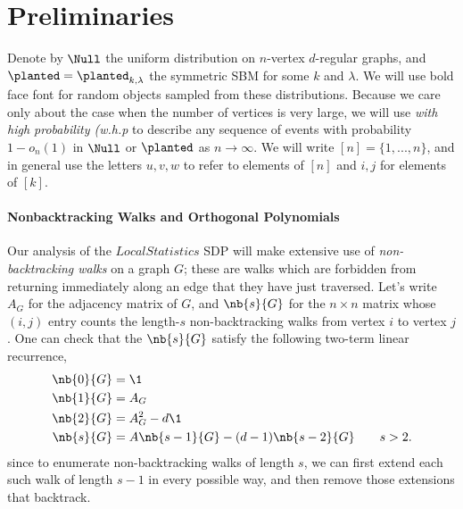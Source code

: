 \section{Preliminaries}
\label{sec:prelims}

Denote by $\Null$ the uniform distribution on $n$-vertex $d$-regular graphs, and $\planted = \planted_{k,\lambda}$ the symmetric SBM for some $k$ and $\lambda$. We will use bold face font for random objects sampled from these distributions. Because we care only about the case when the number of vertices is very large, we will use \emph{with high probability (w.h.p} to describe any sequence of events with probability $1 - o_n(1)$ in $\Null$ or $\planted$ as $n\to \infty$. We will write $[n] = \{1,...,n\}$, and in general use the letters $u,v,w$ to refer to elements of $[n]$ and $i,j$ for elements of $[k]$.

\paragraph{Nonbacktracking Walks and Orthogonal Polynomials}  \label{sec:nbw-poly}
 Our  analysis of the $LocalStatistics$ SDP will make extensive use of \emph{non-backtracking walks} on a graph $G$; these are walks which are forbidden from returning immediately along an edge that they have just traversed. Let's write $A_G$ for the adjacency matrix of $G$, and $\nb{s}{G}$ for the $n\times n$ matrix whose $(i,j)$ entry counts the length-$s$ non-backtracking walks from vertex $i$ to vertex $j$. One can check that the $\nb{s}{G}$ satisfy the following two-term linear recurrence,
\begin{align*}
	\nb{0}{G} &= \1 \\
	\nb{1}{G} &= A_{G} \\
	\nb{2}{G} &= A^2_{G} - d\1 \\
	\nb{s}{G} &= A\nb{s-1}{G} - (d-1)\nb{s-2}{G} \qquad s > 2.
\end{align*}
since to enumerate non-backtracking walks of length $s$, we can first extend each such walk of length $s-1$ in every possible way, and then remove those extensions that backtrack.


